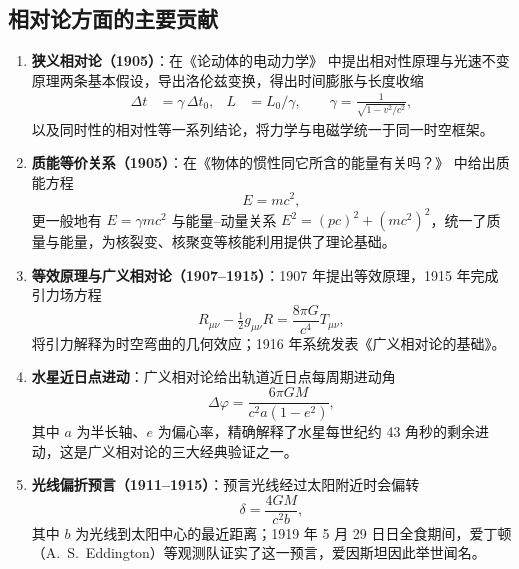 \documentclass{ctexart} %
\begin{document}
\subsection*{相对论方面的主要贡献}
\begin{enumerate}
    \item \textbf{狭义相对论（1905）}：在《论动体的电动力学》\cite{einstein1905sr} 中提出相对性原理与光速不变原理两条基本假设，导出洛伦兹变换，得出时间膨胀与长度收缩
    \begin{align}
        \Delta t &= \gamma\,\Delta t_0, & L &= L_0 / \gamma, \qquad \gamma = \frac{1}{\sqrt{1 - v^2/c^2}},
        \label{eq:sr-main}
    \end{align}
    以及同时性的相对性等一系列结论，将力学与电磁学统一于同一时空框架。
    \item \textbf{质能等价关系（1905）}：在《物体的惯性同它所含的能量有关吗？》\cite{einstein1905mass} 中给出质能方程
    \begin{equation}
        E = mc^2,
        \label{eq:emc2}
    \end{equation}
    更一般地有 $E = \gamma mc^2$ 与能量--动量关系 $E^2 = (pc)^2 + (mc^2)^2$，统一了质量与能量，为核裂变、核聚变等核能利用提供了理论基础。
    \item \textbf{等效原理与广义相对论（1907--1915）}：1907 年提出等效原理，1915 年完成引力场方程\cite{einstein1915field,einstein1916gr}
    \begin{equation}
        R_{\mu\nu} - \tfrac{1}{2}g_{\mu\nu}R = \frac{8\pi G}{c^4}T_{\mu\nu},
        \label{eq:efield-main}
    \end{equation}
    将引力解释为时空弯曲的几何效应；1916 年系统发表《广义相对论的基础》。
    \item \textbf{水星近日点进动}：广义相对论给出轨道近日点每周期进动角
    \begin{equation}
        \Delta\varphi = \frac{6\pi GM}{c^2 a(1-e^2)},
        \label{eq:peri-main}
    \end{equation}
    其中 $a$ 为半长轴、$e$ 为偏心率，精确解释了水星每世纪约 43 角秒的剩余进动\cite{einstein1915mercury}，这是广义相对论的三大经典验证之一。
    \item \textbf{光线偏折预言（1911--1915）}：预言光线经过太阳附近时会偏转
    \begin{equation}
        \delta = \frac{4GM}{c^2 b},
        \label{eq:bend-main}
    \end{equation}
    其中 $b$ 为光线到太阳中心的最近距离；1919 年 5 月 29 日日全食期间，爱丁顿（A.~S.~Eddington）等观测队证实了这一预言\cite{dyson1920}，爱因斯坦因此举世闻名。

\end{enumerate}
\end{document}
